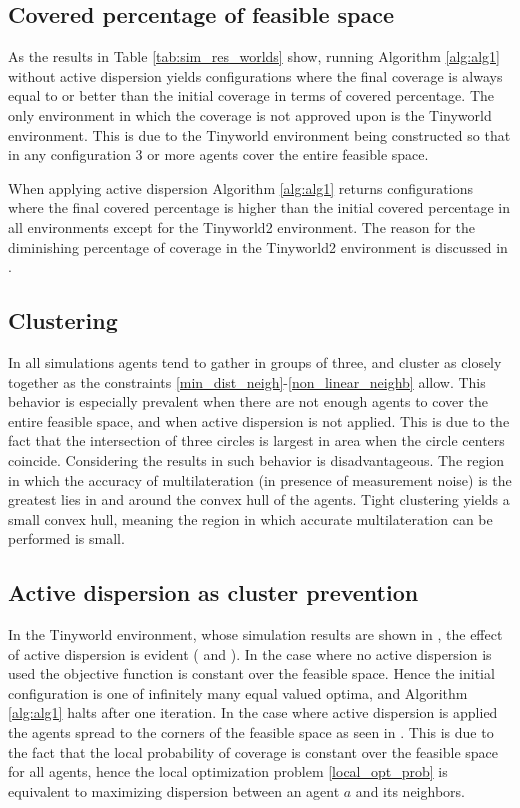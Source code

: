 \subsection{Covered percentage of feasible space}
As the results in Table \ref{tab:sim_res_worlds} show, running Algorithm \ref{alg:alg1} without active dispersion yields configurations where the 
final coverage is always equal to or better than the initial coverage in terms of covered percentage. The only environment in which the coverage is not approved upon is the Tinyworld environment.
This is due to the Tinyworld environment being constructed so that in any configuration 3 or more agents cover the entire feasible space.

When applying active dispersion Algorithm \ref{alg:alg1} returns configurations where the final covered percentage is higher than the initial covered percentage in all environments
except for the Tinyworld2 environment. The reason for the diminishing percentage of coverage in the Tinyworld2 environment is discussed in .

\subsection{Clustering}
In all simulations agents tend to gather in groups of three, and cluster as closely together as the constraints \eqref{min_dist_neigh}-\eqref{non_linear_neighb} allow.  
This behavior is especially prevalent when there are not enough agents to cover the entire feasible space, and when active dispersion is not applied. This is due to 
the fact that the intersection of three circles is largest in area when the circle centers coincide. Considering the results in \cite{CRB_multilat} such behavior is disadvantageous. The region in which
the accuracy of multilateration (in presence of measurement noise) is the greatest lies in and around the convex hull of the agents. Tight clustering yields a small convex hull, 
meaning the region in which accurate multilateration can be performed is small.


\subsection{Active dispersion as cluster prevention}
In the Tinyworld environment, whose simulation results are shown in , the effect of active dispersion is evident ( and ). 
In the case where no active dispersion is used the objective function is constant over the feasible space. Hence the initial configuration is one of 
infinitely many equal valued optima, and Algorithm \ref{alg:alg1} halts after one iteration. In the case where active dispersion is applied the agents spread to the corners of the
feasible space as seen in . This is due to the fact that the local probability of coverage is constant over the feasible space for all agents, hence the 
local optimization problem \eqref{local_opt_prob} is equivalent to maximizing dispersion between an agent $a$ and its neighbors. 

